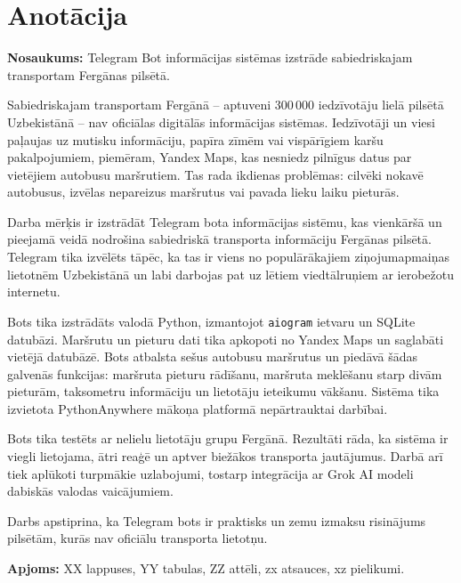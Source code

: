 \section*{Anotācija}

\textbf{Nosaukums:} Telegram Bot informācijas sistēmas izstrāde
sabiedriskajam transportam Fergānas pilsētā.

\medskip

Sabiedriskajam transportam Fergānā -- aptuveni 300\,000 iedzīvotāju
lielā pilsētā Uzbekistānā -- nav oficiālas digitālās informācijas
sistēmas. Iedzīvotāji un viesi paļaujas uz mutisku informāciju, papīra
zīmēm vai vispārīgiem karšu pakalpojumiem, piemēram, Yandex Maps, kas
nesniedz pilnīgus datus par vietējiem autobusu maršrutiem. Tas rada
ikdienas problēmas: cilvēki nokavē autobusus, izvēlas nepareizus
maršrutus vai pavada lieku laiku pieturās.

Darba mērķis ir izstrādāt Telegram bota informācijas sistēmu, kas
vienkāršā un pieejamā veidā nodrošina sabiedriskā transporta
informāciju Fergānas pilsētā. Telegram tika izvēlēts tāpēc, ka tas ir
viens no populārākajiem ziņojumapmaiņas lietotnēm Uzbekistānā un labi
darbojas pat uz lētiem viedtālruņiem ar ierobežotu internetu.

Bots tika izstrādāts valodā Python, izmantojot \texttt{aiogram}
ietvaru un SQLite datubāzi. Maršrutu un pieturu dati tika apkopoti no
Yandex Maps un saglabāti vietējā datubāzē. Bots atbalsta sešus
autobusu maršrutus un piedāvā šādas galvenās funkcijas: maršruta
pieturu rādīšanu, maršruta meklēšanu starp divām pieturām, taksometru
informāciju un lietotāju ieteikumu vākšanu. Sistēma tika izvietota
PythonAnywhere mākoņa platformā nepārtrauktai darbībai.

Bots tika testēts ar nelielu lietotāju grupu Fergānā. Rezultāti rāda,
ka sistēma ir viegli lietojama, ātri reaģē un aptver biežākos
transporta jautājumus. Darbā arī tiek aplūkoti turpmākie uzlabojumi,
tostarp integrācija ar Grok AI modeli dabiskās valodas vaicājumiem.

Darbs apstiprina, ka Telegram bots ir praktisks un zemu izmaksu
risinājums pilsētām, kurās nav oficiālu transporta lietotņu.

\medskip

\noindent\textbf{Apjoms:} XX lappuses, YY tabulas, ZZ attēli,
zx atsauces, xz pielikumi.
\newpage
